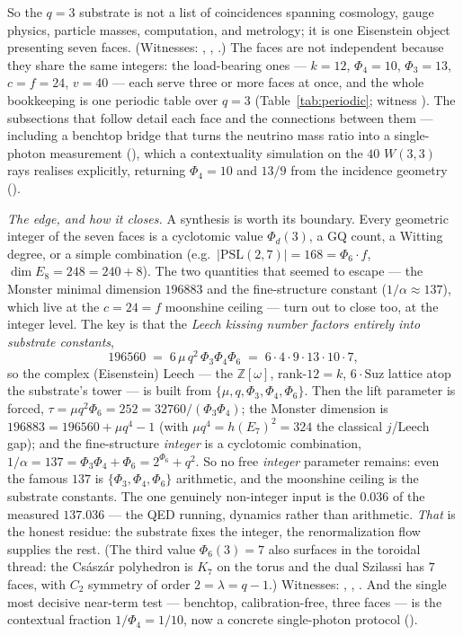 \documentclass[11pt]{article}
\newcommand{\W}{W(3,3)}
\begin{document}
So the $q=3$ substrate is not a list of coincidences spanning cosmology, gauge
physics, particle masses, computation, and metrology; it is one Eisenstein object
presenting seven faces. (Witnesses: ,
, .)
The faces are not independent because they share the same integers: the load-bearing
ones --- $k=12$, $\Phi_4=10$, $\Phi_3=13$, $c{=}f=24$, $v=40$ --- each serve three or
more faces at once, and the whole bookkeeping is one periodic table over $q=3$
(Table~\ref{tab:periodic}; witness ).
The subsections that follow detail each face and the connections between them ---
including a benchtop bridge that turns the neutrino mass ratio into a single-photon
measurement (), which a contextuality
simulation on the $40$ $\W$ rays realises explicitly, returning $\Phi_4=10$ and $13/9$
from the incidence geometry ().

\emph{The edge, and how it closes.} A synthesis is worth its boundary. Every geometric
integer of the seven faces is a cyclotomic value $\Phi_d(3)$, a GQ count, a Witting
degree, or a simple combination (e.g.\ $\lvert\mathrm{PSL}(2,7)\rvert=168=\Phi_6\!\cdot
\!f$, $\dim E_8=248=240+8$). The two quantities that seemed to escape --- the Monster
minimal dimension $196883$ and the fine-structure constant ($1/\alpha\approx137$),
which live at the $c=24=f$ moonshine ceiling --- turn out to close too, at the integer
level. The key is that the \emph{Leech kissing number factors entirely into substrate
constants},
\[
196560 \;=\; 6\,\mu\,q^2\,\Phi_3\Phi_4\Phi_6 \;=\; 6\cdot4\cdot9\cdot13\cdot10\cdot7,
\]
so the complex (Eisenstein) Leech --- the $\mathbb Z[\omega]$, rank-$12{=}k$, $6\cdot
\mathrm{Suz}$ lattice atop the substrate's tower --- is built from $\{\mu,q,\Phi_3,
\Phi_4,\Phi_6\}$. Then the lift parameter is forced, $\tau=\mu q^2\Phi_6=252=32760/
(\Phi_3\Phi_4)$; the Monster dimension is $196883=196560+\mu q^4-1$ (with $\mu
q^4=h(E_7)^2=324$ the classical $j$/Leech gap); and the fine-structure \emph{integer}
is a cyclotomic combination, $1/\alpha=137=\Phi_3\Phi_4+\Phi_6=2^{\Phi_6}+q^2$. So no
free \emph{integer} parameter remains: even the famous $137$ is $\{\Phi_3,\Phi_4,
\Phi_6\}$ arithmetic, and the moonshine ceiling is the substrate constants. The one
genuinely non-integer input is the $0.036$ of the measured $137.036$ --- the QED
running, dynamics rather than arithmetic. \emph{That} is the honest residue: the
substrate fixes the integer, the renormalization flow supplies the rest. (The third
value $\Phi_6(3)=7$ also surfaces in the toroidal thread: the Cs\'asz\'ar polyhedron is
$K_7$ on the torus and the dual Szilassi has $7$ faces, with $C_2$ symmetry of order
$2=\lambda=q-1$.) Witnesses: ,
,
. And the single most decisive near-term
test --- benchtop, calibration-free, three faces --- is the contextual fraction
$1/\Phi_4=1/10$, now a concrete single-photon protocol
().
\end{document}
